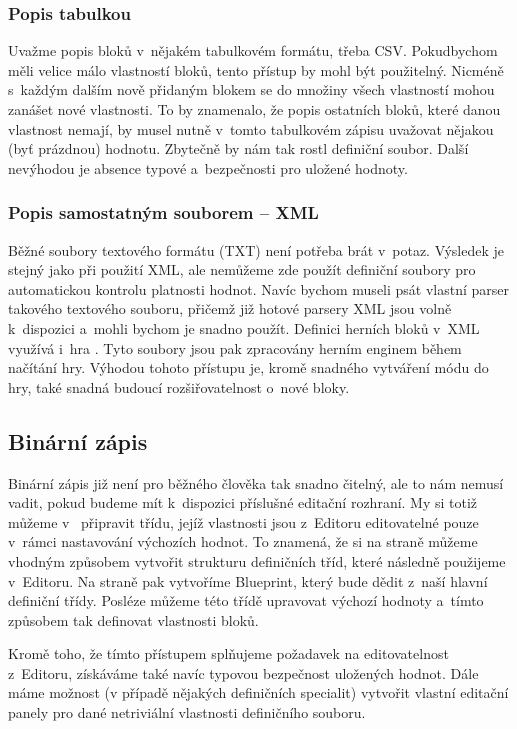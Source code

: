 \subsubsection{Popis tabulkou}
Uvažme popis bloků v~nějakém tabulkovém formátu, třeba CSV. Pokud\linebreak bychom měli velice málo vlastností bloků, tento přístup by mohl být použitelný. Nicméně s~každým dalším nově přidaným blokem se do množiny všech vlastností mohou zanášet nové vlastnosti. To by znamenalo, že popis ostatních bloků, které danou vlastnost nemají, by musel nutně v~tomto tabulkovém zápisu uvažovat nějakou (byť prázdnou) hodnotu. Zbytečně by nám tak rostl definiční soubor. Další nevýhodou je absence typové a~bezpečnosti pro uložené hodnoty. 

\subsubsection{Popis samostatným souborem -- XML}
Běžné soubory textového formátu (TXT) není potřeba brát v~potaz. Výsledek je stejný jako při použití XML, ale nemůžeme zde použít definiční soubory pro automatickou kontrolu platnosti hodnot. Navíc bychom museli psát vlastní parser takového textového souboru, přičemž již hotové parsery XML jsou volně k~dispozici a~mohli bychom je snadno použít. Definici herních bloků v~XML využívá i~hra \ME{}. Tyto soubory jsou pak zpracovány herním enginem během načítání hry. Výhodou tohoto přístupu je, kromě snadného vytváření módu do hry, také snadná budoucí rozšiřovatelnost o~nové bloky.

\subsection{Binární zápis}
Binární zápis již není pro běžného člověka tak snadno čitelný, ale to nám nemusí vadit, pokud budeme mít k~dispozici příslušné editační rozhraní. My si totiž můžeme v~\UEu{} připravit třídu, jejíž vlastnosti jsou z~Editoru editovatelné pouze v~rámci nastavování výchozích hodnot. To znamená, že si na straně \CPP{} můžeme vhodným způsobem vytvořit strukturu definičních tříd, které následně použijeme v~Editoru. Na straně \UEu{} pak vytvoříme Blueprint, který bude dědit z~naší hlavní definiční třídy. Posléze můžeme této třídě upravovat výchozí hodnoty a~tímto způsobem tak definovat vlastnosti bloků.

Kromě toho, že tímto přístupem splňujeme požadavek na editovatelnost z~Editoru, získáváme také navíc typovou bezpečnost uložených hodnot. Dále máme možnost (v případě nějakých definičních specialit) vytvořit vlastní editační panely pro dané netriviální vlastnosti definičního souboru. 


